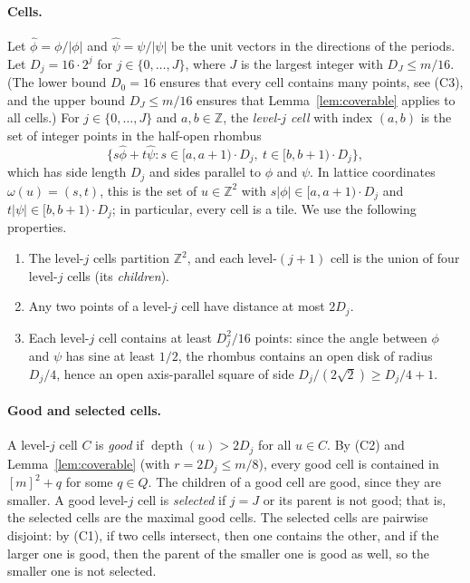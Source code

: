 \documentclass[11pt]{article}
\theoremstyle{definition}
\newcommand{\Z}{\mathbb{Z}}
\DeclareMathOperator{\depth}{depth}
\newcommand{\abs}[1]{\lvert #1 \rvert}
\begin{document}
\paragraph{Cells.}
Let $\hat\phi = \phi/\abs{\phi}$ and $\hat\psi = \psi/\abs{\psi}$ be the unit vectors in the directions of the periods.
Let $D_j = 16 \cdot 2^j$ for $j \in \{0, \dots, J\}$, where $J$ is the largest integer with $D_J \le m/16$.
(The lower bound $D_0 = 16$ ensures that every cell contains many points, see (C3), and the upper bound $D_J \le m/16$ ensures that Lemma~\ref{lem:coverable} applies to all cells.)
For $j \in \{0, \dots, J\}$ and $a, b \in \Z$, the \emph{level-$j$ cell} with index $(a,b)$ is the set of integer points in the half-open rhombus
\[ \{s\hat\phi + t\hat\psi : s \in [a, a+1) \cdot D_j,\ t \in [b, b+1) \cdot D_j\}, \]
which has side length $D_j$ and sides parallel to $\phi$ and $\psi$.
In lattice coordinates $\omega(u) = (s,t)$, this is the set of $u \in \Z^2$ with $s\abs{\phi} \in [a, a+1) \cdot D_j$ and $t\abs{\psi} \in [b, b+1) \cdot D_j$; in particular, every cell is a tile.
We use the following properties.
\begin{enumerate}[(C1)]
\item The level-$j$ cells partition $\Z^2$, and each level-$(j+1)$ cell is the union of four level-$j$ cells (its \emph{children}).
\item Any two points of a level-$j$ cell have distance at most $2D_j$.
\item Each level-$j$ cell contains at least $D_j^2/16$ points: since the angle between $\phi$ and $\psi$ has sine at least $1/2$, the rhombus contains an open disk of radius $D_j/4$, hence an open axis-parallel square of side $D_j/(2\sqrt2) \ge D_j/4 + 1$.
\end{enumerate}

\paragraph{Good and selected cells.}
A level-$j$ cell $C$ is \emph{good} if $\depth(u) > 2D_j$ for all $u \in C$.
By (C2) and Lemma~\ref{lem:coverable} (with $r = 2D_j \le m/8$), every good cell is contained in $[m]^2 + q$ for some $q \in Q$.
The children of a good cell are good, since they are smaller.
A good level-$j$ cell is \emph{selected} if $j = J$ or its parent is not good; that is, the selected cells are the maximal good cells.
The selected cells are pairwise disjoint: by (C1), if two cells intersect, then one contains the other, and if the larger one is good, then the parent of the smaller one is good as well, so the smaller one is not selected.
\end{document}
